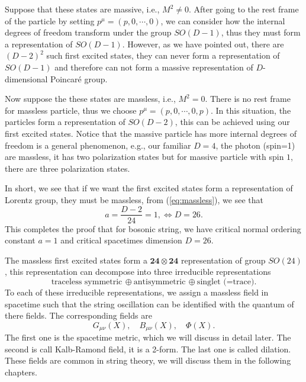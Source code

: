 \documentclass[graybox,envcountchap,sectrefs]{svmono}
\begin{document}
Suppose that these states are massive, i.e., $M^2\neq 0$. After going to the rest frame of the particle by setting $p^{\mu}=(p,0,\cdots,0)$, we can consider how the internal degrees of freedom transform under the group $SO(D-1)$, thus they must form a representation of $SO(D-1)$. However, as we have pointed out, there are $(D-2)^2$ such first excited states, they can never form a representation of $SO(D-1)$ and therefore can not form a massive representation of $D$-dimensional Poincar\'{e} group.

Now suppose the these states are massless, i.e., $M^2= 0$. There is no rest frame for massless particle, thus we choose $p^{\mu}=(p,0,\cdots,0,p)$. In this situation, the particles form a representation of $SO(D-2)$, this can be achieved using our first excited states. Notice that the massive particle has more internal degrees of freedom is a general phenomenon, e.g., our familiar $D=4$, the photon (spin=1) are massless, it has two polarization states but for massive particle with spin $1$, there are three polarization states.

In short, we see that if we want the first excited states form a representation of Lorentz group, they must be massless, from (\ref{eq:massless}), we see that 
\begin{equation}
a=\frac{D-2}{24}=1, \Leftrightarrow D=26.	
\end{equation}
This completes the proof that for bosonic string, we have critical normal ordering constant $a=1$ and critical spacetimes dimension $D=26$.

The massless first excited states form a $\mathbf{24}\otimes \mathbf{24}$ representation of group $SO(24)$, this representation can decompose into three irreducible representations
\begin{equation}
\text{traceless symmetric}\,\oplus \text{antisymmetric}\,\oplus \text{singlet (=trace)}.
\end{equation}
To each of these irreducible representations, we assign a massless field in spacetime such that the string oscillation can be identified with the quantum of there fields. The corresponding fields are
\begin{equation}
G_{\mu\nu}(X), \quad	 B_{\mu\nu}(X), \quad \Phi(X).
\end{equation}
The first one is the spacetime metric, which we will discuss in detail later. The second is call Kalb-Ramond field, it is a 2-form. The last one is called dilation. These fields are common in string theory, we will discuss them in the following chapters.
\end{document}
